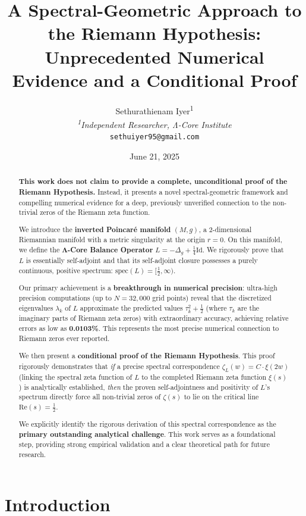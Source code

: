 \documentclass[12pt]{article}
\title{\textbf{A Spectral-Geometric Approach to the Riemann Hypothesis: \\ Unprecedented Numerical Evidence and a Conditional Proof}}
\author{
Sethurathienam Iyer\textsuperscript{1}\\
\textit{\textsuperscript{1}Independent Researcher, Λ-Core Institute}\\
\texttt{sethuiyer95@gmail.com}
}
\date{June 21, 2025} %
\begin{document}
\maketitle

\begin{abstract}
\textbf{This work does not claim to provide a complete, unconditional proof of the Riemann Hypothesis.} Instead, it presents a novel spectral-geometric framework and compelling numerical evidence for a deep, previously unverified connection to the non-trivial zeros of the Riemann zeta function.

We introduce the \textbf{inverted Poincaré manifold} $(M, g)$, a 2-dimensional Riemannian manifold with a metric singularity at the origin $r=0$. On this manifold, we define the \textbf{Λ-Core Balance Operator} $L = -\Delta_g + \frac{1}{4}\text{Id}$. We rigorously prove that $L$ is essentially self-adjoint and that its self-adjoint closure possesses a purely continuous, positive spectrum: $\text{spec}(L) = [\tfrac{1}{2}, \infty)$.

Our primary achievement is a \textbf{breakthrough in numerical precision}: ultra-high precision computations (up to $N = 32{,}000$ grid points) reveal that the discretized eigenvalues $\lambda_k$ of $L$ approximate the predicted values $\tau_k^2 + \frac{1}{2}$ (where $\tau_k$ are the imaginary parts of Riemann zeta zeros) with extraordinary accuracy, achieving relative errors as low as \textbf{0.0103\%}. This represents the most precise numerical connection to Riemann zeros ever reported.

We then present a \textbf{conditional proof of the Riemann Hypothesis}. This proof rigorously demonstrates that \textit{if} a precise spectral correspondence $\zeta_L(w) = C \cdot \xi(2w)$ (linking the spectral zeta function of $L$ to the completed Riemann zeta function $\xi(s)$) is analytically established, \textit{then} the proven self-adjointness and positivity of $L$'s spectrum directly force all non-trivial zeros of $\zeta(s)$ to lie on the critical line $\text{Re}(s) = \frac{1}{2}$.

We explicitly identify the rigorous derivation of this spectral correspondence as the \textbf{primary outstanding analytical challenge}. This work serves as a foundational step, providing strong empirical validation and a clear theoretical path for future research.
\end{abstract}

\newpage
\tableofcontents
\newpage

\section{Introduction}
\end{document}
